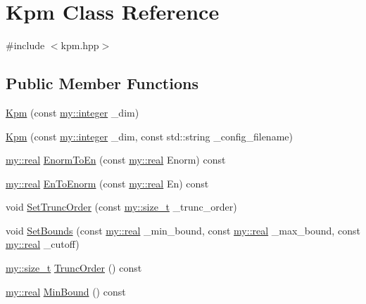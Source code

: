 \hypertarget{classKpm}{\section{Kpm Class Reference}
\label{classKpm}
}


{\ttfamily \#include $<$kpm.\+hpp$>$}

\subsection*{Public Member Functions}
\begin{DoxyCompactItemize}
\item 
\hyperlink{classKpm_a2f3c9892bf4c47a3bb75b462fc281315}{Kpm} (const \hyperlink{namespacemy_a42365393c537edae1e89d20ff90d1923}{my\+::integer} \+\_\+dim)
\item 
\hyperlink{classKpm_abb873c0ef41f38ce2c988d4d92a2338c}{Kpm} (const \hyperlink{namespacemy_a42365393c537edae1e89d20ff90d1923}{my\+::integer} \+\_\+dim, const std\+::string \+\_\+config\+\_\+filename)
\item 
\hyperlink{namespacemy_ad61baeaeda728a4c48dd64f93e44a46c}{my\+::real} \hyperlink{classKpm_aa8e4c1f1ffc3e204f4ac01410ee3304d}{Enorm\+To\+En} (const \hyperlink{namespacemy_ad61baeaeda728a4c48dd64f93e44a46c}{my\+::real} Enorm) const 
\item 
\hyperlink{namespacemy_ad61baeaeda728a4c48dd64f93e44a46c}{my\+::real} \hyperlink{classKpm_ada4a0a87a8751ef413b137f92caa995c}{En\+To\+Enorm} (const \hyperlink{namespacemy_ad61baeaeda728a4c48dd64f93e44a46c}{my\+::real} En) const 
\item 
void \hyperlink{classKpm_a6ce69853d564792d5c1803097dd815cd}{Set\+Trunc\+Order} (const \hyperlink{namespacemy_ac9e2c9fc46dc44ed285976e482ee6ef4}{my\+::size\+\_\+t} \+\_\+trunc\+\_\+order)
\item 
void \hyperlink{classKpm_aa6ab229c488be467a50c988d39c32478}{Set\+Bounds} (const \hyperlink{namespacemy_ad61baeaeda728a4c48dd64f93e44a46c}{my\+::real} \+\_\+min\+\_\+bound, const \hyperlink{namespacemy_ad61baeaeda728a4c48dd64f93e44a46c}{my\+::real} \+\_\+max\+\_\+bound, const \hyperlink{namespacemy_ad61baeaeda728a4c48dd64f93e44a46c}{my\+::real} \+\_\+cutoff)
\item 
\hyperlink{namespacemy_ac9e2c9fc46dc44ed285976e482ee6ef4}{my\+::size\+\_\+t} \hyperlink{classKpm_a73155441b5efe4d64638c0e5670b09c8}{Trunc\+Order} () const 
\item 
\hyperlink{namespacemy_ad61baeaeda728a4c48dd64f93e44a46c}{my\+::real} \hyperlink{classKpm_a472512f06e6a48e6680e49d174fde7be}{Min\+Bound} () const 

\end{DoxyCompactItemize}
